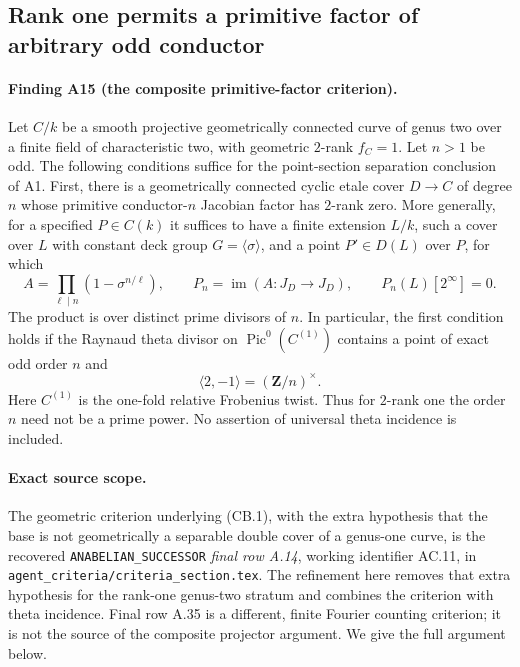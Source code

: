 \subsection{Rank one permits a primitive factor of arbitrary odd conductor}
\label{sec:rank-one-composite-bridge}

\paragraph{Finding A15 (the composite primitive-factor criterion).}
Let $C/k$ be a smooth projective geometrically connected curve of genus
two over a finite field of characteristic two, with geometric $2$-rank
$f_C=1$. Let $n>1$ be odd. The following conditions suffice for the
point-section separation conclusion of A1.
First, there is a geometrically connected cyclic etale cover
$D\to C$ of degree $n$ whose primitive conductor-$n$ Jacobian factor
has $2$-rank zero. More generally, for a specified $P\in C(k)$ it
suffices to have a finite extension $L/k$, such a cover over $L$ with
constant deck group $G=\langle\sigma\rangle$, and a point
$P'\in D(L)$ over $P$, for which
\[
 A=\prod_{\ell\mid n}(1-\sigma^{n/\ell}),\qquad
 P_n=\operatorname{im}(A:J_D\longrightarrow J_D),\qquad
 P_n(L)[2^\infty]=0.                                      \tag{CB.1}
\]
The product is over distinct prime divisors of $n$.
In particular, the first condition holds if the Raynaud theta divisor
on $\operatorname{Pic}^0(C^{(1)})$ contains a point of exact odd order
$n$ and
\[
                    \langle 2,-1\rangle=(\mathbf Z/n)^\times.
                                                               \tag{CB.2}
\]
Here $C^{(1)}$ is the one-fold relative Frobenius twist. Thus for
$2$-rank one the order $n$ need not be a prime power. No assertion of
universal theta incidence is included.

\paragraph{Exact source scope.}
The geometric criterion underlying (CB.1), with the extra hypothesis
that the base is not geometrically a separable double cover of a
genus-one curve, is the recovered \texttt{ANABELIAN\_SUCCESSOR}
\emph{final row A.14}, working identifier AC.11, in
\texttt{agent\_criteria/criteria\_section.tex}. The refinement here
removes that extra hypothesis for the rank-one genus-two stratum and
combines the criterion with theta incidence. Final row A.35 is a
different, finite Fourier counting criterion; it is not the source of
the composite projector argument. We give the full argument below.

